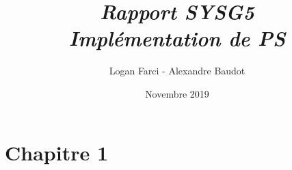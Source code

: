 \documentclass[french,10pt,A4]{report}
\begin{document}
\cfoot{ }
\renewcommand{\footrulewidth}{0.4pt}

\setlength{\parindent}{0pt} %

\lstset{frame=trBL}

\setcounter{tocdepth}{1}	%
\setcounter{secnumdepth}{5}	%

\newcommand{\titre}{Titre du sujet}	%

\thispagestyle{empty}

\title{\emph{Rapport SYSG5\\\textbf{Implémentation de PS}}}
\author{Logan Farci - Alexandre Baudot}
\date{Novembre 2019}
\maketitle
\tableofcontents

\newpage
%
\chapter{Chapitre 1}
	 
\end{document}
